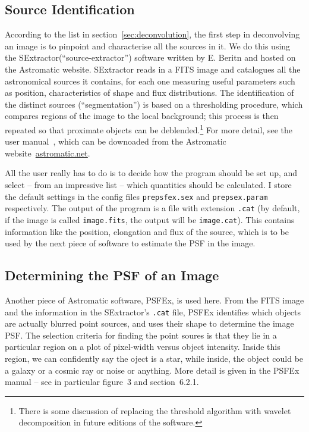 \documentclass[letterpaper, 11pt]{article}
\def\sextractor{SExtractor\xspace}
\def\psfex{PSFEx\xspace}
\begin{document}
\subsection{Source Identification}
\label{sec:sextractor}

According to the list in section~\ref{sec:deconvolution}, the first step in deconvolving an image is to pinpoint and characterise all the sources in it. We do this using the \sextractor (``source-extractor'') software written by E. Beritn and hosted on the Astromatic website. \sextractor reads in a FITS image and catalogues all the astronomical sources it contains, for each one measuring useful parameters such as position, characteristics of shape and flux distributions. The identification of the distinct sources (``segmentation'') is based on a thresholding procedure, which compares regions of the image to the local background; this process is then repeated so that proximate objects can be deblended.\footnote{There is some discussion of replacing the threshold algorithm with wavelet decomposition in future editions of the software.} For more detail, see the user manual~\citep{sex96}, which can be downoaded from the Astromatic website~\url{astromatic.net}.

All the user really has to do is to decide how the program should be set up, and select -- from an impressive list -- which quantities should be calculated. I store the default settings in the config files  \texttt{prepsfex.sex} and \texttt{prepsex.param} respectively. The output of the program is a file with extension \texttt{.cat} (by default, if the image is called \texttt{image.fits}, the output will be \texttt{image.cat}). This contains information like the position, elongation and flux of the source, which is to be used by the next piece of software to estimate the PSF in the image.

\subsection{Determining the PSF of an Image}
\label{sec:psfex}

Another piece of Astromatic software, \psfex, is used here. From the FITS image and the information in the \sextractor's \texttt{.cat} file, \psfex identifies which objects are actually blurred point sources, and uses their shape to determine the image PSF. The selection criteria for finding the point soures is that they lie in a particular region on a plot of pixel-width versus object intensity. Inside this region, we can confidently say the oject is a star, while inside, the object could be a galaxy or a cosmic ray or noise or anything. More detail is given in the \psfex manual \citep{psfex11} -- see in particular figure~3 and section~6.2.1.
\end{document}

